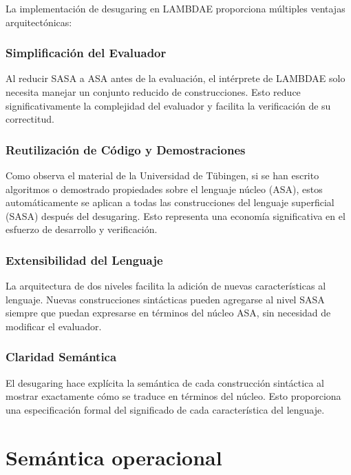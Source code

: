 \documentclass[a4paper,12pt]{article}
\begin{document}
La implementación de desugaring en LAMBDAE proporciona múltiples ventajas arquitectónicas:

\subsubsection{Simplificación del Evaluador}

Al reducir SASA a ASA antes de la evaluación, el intérprete de LAMBDAE solo necesita manejar un conjunto reducido de construcciones. Esto reduce significativamente la complejidad del evaluador y facilita la verificación de su correctitud.

\subsubsection{Reutilización de Código y Demostraciones}

Como observa el material de la Universidad de Tübingen, si se han escrito algoritmos o demostrado propiedades sobre el lenguaje núcleo (ASA), estos automáticamente se aplican a todas las construcciones del lenguaje superficial (SASA) después del desugaring. Esto representa una economía significativa en el esfuerzo de desarrollo y verificación.

\subsubsection{Extensibilidad del Lenguaje}

La arquitectura de dos niveles facilita la adición de nuevas características al lenguaje. Nuevas construcciones sintácticas pueden agregarse al nivel SASA siempre que puedan expresarse en términos del núcleo ASA, sin necesidad de modificar el evaluador.

\subsubsection{Claridad Semántica}

El desugaring hace explícita la semántica de cada construcción sintáctica al mostrar exactamente cómo se traduce en términos del núcleo. Esto proporciona una especificación formal del significado de cada característica del lenguaje.



\section{Semántica operacional}
\end{document}
